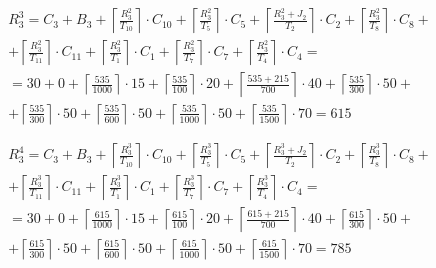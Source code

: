 \begin{gather*}
\begin{multlined}
  \end{multlined} \\
  \begin{multlined}
    R_3^3 = C_3 + B_3 + \left\lceil\frac{R_3^2}{T_{10}}\right\rceil\cdot C_{10} + %
    \left\lceil\frac{R_3^2}{T_5}\right\rceil\cdot C_5 + %
    \left\lceil\frac{R_3^2 + J_2}{T_2}\right\rceil\cdot C_2 + %
    \left\lceil\frac{R_3^2}{T_8}\right\rceil\cdot C_8 + \\%
    + \left\lceil\frac{R_3^2}{T_{11}}\right\rceil\cdot C_{11} + %
    \left\lceil\frac{R_3^2}{T_1}\right\rceil\cdot C_1 +%
    \left\lceil\frac{R_3^2}{T_7}\right\rceil\cdot C_7 +%
    \left\lceil\frac{R_3^2}{T_4}\right\rceil\cdot C_4 = \\%
    = 30 + 0 + \left\lceil\frac{535}{1000}\right\rceil\cdot 15 + %
    \left\lceil\frac{535}{100}\right\rceil\cdot 20 + %
    \left\lceil\frac{535 + 215}{700}\right\rceil\cdot 40 + %
    \left\lceil\frac{535}{300}\right\rceil\cdot 50 + \\%
    + \left\lceil\frac{535}{300}\right\rceil\cdot 50 + %
    \left\lceil\frac{535}{600}\right\rceil\cdot 50 + %
    \left\lceil\frac{535}{1000}\right\rceil\cdot 50 +%
    \left\lceil\frac{535}{1500}\right\rceil\cdot 70 = 615 \\
  \end{multlined} \\
  \begin{multlined}
    R_3^4 = C_3 + B_3 + \left\lceil\frac{R_3^3}{T_{10}}\right\rceil\cdot C_{10} + %
    \left\lceil\frac{R_3^3}{T_5}\right\rceil\cdot C_5 + %
    \left\lceil\frac{R_3^3 + J_2}{T_2}\right\rceil\cdot C_2 + %
    \left\lceil\frac{R_3^3}{T_8}\right\rceil\cdot C_8 + \\%
    + \left\lceil\frac{R_3^3}{T_{11}}\right\rceil\cdot C_{11} + %
    \left\lceil\frac{R_3^3}{T_1}\right\rceil\cdot C_1 +%
    \left\lceil\frac{R_3^3}{T_7}\right\rceil\cdot C_7 +%
    \left\lceil\frac{R_3^3}{T_4}\right\rceil\cdot C_4 = \\%
    = 30 + 0 + \left\lceil\frac{615}{1000}\right\rceil\cdot 15 + %
    \left\lceil\frac{615}{100}\right\rceil\cdot 20 + %
    \left\lceil\frac{615 + 215}{700}\right\rceil\cdot 40 + %
    \left\lceil\frac{615}{300}\right\rceil\cdot 50 + \\%
    + \left\lceil\frac{615}{300}\right\rceil\cdot 50 + %
    \left\lceil\frac{615}{600}\right\rceil\cdot 50 + %
    \left\lceil\frac{615}{1000}\right\rceil\cdot 50 +%
    \left\lceil\frac{615}{1500}\right\rceil\cdot 70 = 785 \\
  \end{multlined} \\
\end{gather*}
